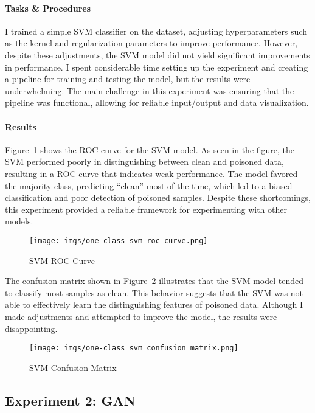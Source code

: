 \documentclass[14]{article}
\begin{document}
\paragraph{Tasks \& Procedures}

I trained a simple SVM classifier on the dataset, adjusting hyperparameters such as the kernel and regularization parameters to improve performance. However, despite these adjustments, the SVM model did not yield significant improvements in performance. I spent considerable time setting up the experiment and creating a pipeline for training and testing the model, but the results were underwhelming. The main challenge in this experiment was ensuring that the pipeline was functional, allowing for reliable input/output and data visualization.

\paragraph{Results}

Figure~\ref{fig:svm_roc} shows the ROC curve for the SVM model. As seen in the figure, the SVM performed poorly in distinguishing between clean and poisoned data, resulting in a ROC curve that indicates weak performance. The model favored the majority class, predicting “clean” most of the time, which led to a biased classification and poor detection of poisoned samples. Despite these shortcomings, this experiment provided a reliable framework for experimenting with other models.

\begin{figure}[h]
    \centering
    \texttt{[image: imgs/one-class\_svm\_roc\_curve.png]}
    \caption{SVM ROC Curve}
    \label{fig:svm_roc}
\end{figure}

The confusion matrix shown in Figure~\ref{fig:svm_confuse} illustrates that the SVM model tended to classify most samples as clean. This behavior suggests that the SVM was not able to effectively learn the distinguishing features of poisoned data. Although I made adjustments and attempted to improve the model, the results were disappointing.

\begin{figure}[h]
    \centering
    \texttt{[image: imgs/one-class\_svm\_confusion\_matrix.png]}
    \caption{SVM Confusion Matrix}
    \label{fig:svm_confuse}
\end{figure}

\subsection{Experiment 2: GAN}
\end{document}
